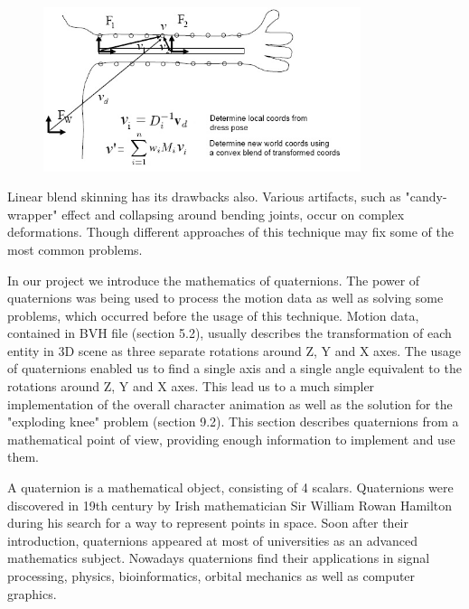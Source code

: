 \documentclass[times, 10pt,twocolumn]{article}
\begin{document}
\begin{figure}[H]
  \caption{}
  \centering
  \includegraphics[width=93mm]{images/hand2.jpg}
\end{figure}

Linear blend skinning has its drawbacks also. Various artifacts, such as "candy-wrapper" effect and collapsing around bending joints, occur on complex deformations. Though different approaches of this technique may fix some of the most common problems.

\label{Quaternions}
In our project we introduce the mathematics of quaternions. The power of quaternions was being used to process the motion data as well as solving some problems, which occurred before the usage of this technique. Motion data, contained in BVH file (section 5.2), usually describes the transformation of each entity in 3D scene as three separate rotations around Z, Y and X axes. The usage of quaternions enabled us to find a single axis and a single angle equivalent to the rotations around Z, Y and X axes.  This lead us to a much simpler implementation of the overall character animation as well as the solution for the "exploding knee" problem (section 9.2). This section describes quaternions from a mathematical point of view, providing enough information to implement and use them.

A quaternion is a mathematical object, consisting of 4 scalars. Quaternions were discovered in 19th century by Irish mathematician Sir William Rowan Hamilton during his search for a way to represent points in space.  Soon after their introduction, quaternions appeared at most of universities as an advanced mathematics subject. Nowadays quaternions find their applications in signal processing, physics, bioinformatics, orbital mechanics as well as computer graphics.
	
\end{document}
